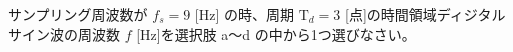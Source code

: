 サンプリング周波数が $f_s = 9$ [Hz] の時、周期 $\textrm{T}_d = 3$ [点]の時間領域ディジタルサイン波の周波数 $f$ [Hz]を選択肢 a〜d の中から1つ選びなさい。
